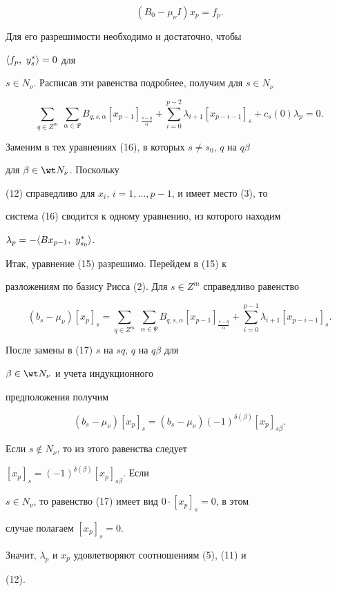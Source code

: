 \begin{pf}
\begin{equation}
(B_0-\mu_\nu I)x_p=f_p. 


\end{equation} 


Для его разрешимости необходимо и достаточно, чтобы 


$\langle f_p,\ y^*_s\rangle=0$ для 


$s\in N_\nu$. Расписав эти равенства подробнее, получим для $s\in 


N_\nu$ 


\begin{equation} 


\sum_{q\in Z^m}\;\sum_{\alpha\in\Psi}B_{q,s,\alpha} 


[x_{p-1}]_{\frac{s-q}{\alpha}}+\sum^{p-2}_{i=0}\lambda_{i+1} 


[x_{p-i-1}]_s+c_s(0)\lambda_p=0. 


\end{equation} 


Заменим в тех уравнениях (16), в которых $s\ne s_0$, $q$ на $q\beta$ 


для $\beta\in\wt N_\nu$. Поскольку 


(12) справедливо для $x_i$, $i=1,\dotsc,p-1$, и имеет место (3), то 


система (16) сводится к одному уравнению, из которого находим 


$\lambda_p=-\la B x_{p-1},\ y^*_{s_0}\ra$. 


Итак, уравнение (15) разрешимо. Перейдем в (15) к 


разложениям по базису Рисса (2). Для $s\in Z^m$ справедливо равенство 


\begin{equation} 


(b_s-\mu_\nu)[x_p]_s=\sum_{q\in Z^m}\; 


\sum_{\alpha\in\Psi}B_{q,s,\alpha}[x_{p-1}]_{\frac{s-q}{\alpha}} 


+\sum^{p-1}_{i=0}\lambda_{i+1}[x_{p-i-1}]_s. 


\end{equation} 


После замены в (17) $s$ на $s{}q$, $q$ на $q\beta$ для 


$\beta\in\wt N_\nu$ и учета индукционного 


предположения получим 


$$ 


(b_s-\mu_\nu)[x_p]_s=(b_s-\mu_\nu)(-1)^{\delta(\beta)} 


[x_p]_{s\beta}. 


$$ 


Если $s\notin N_\nu$, то из этого равенства следует 


$[x_p]_s=(-1)^{\delta(\beta)}[x_p]_{s\beta}$. Если 


$s\in N_\nu$, то равенство (17) имеет вид $0\cdot[x_p]_s=0$, в этом 


случае полагаем $[x_p]_s=0$. 


Значит, $\lambda_p$ и $x_p$ удовлетворяют соотношениям (5), (11) и 


(12). 


\end{pf} 


